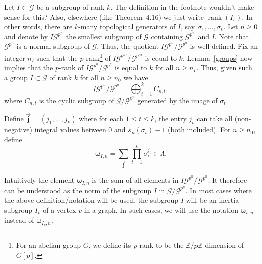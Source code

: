 \documentclass{amsart}
\numberwithin{equation}{section}
\theoremstyle{remark}
\newcommand{\rk}{\operatorname{rank}}
\newcommand{\Z}{\mathbb{Z}}
\newcommand{\cG}{\mathcal{G}}
\newcommand{\bomega}{\boldsymbol{\omega}}
\theoremstyle{plain} %
\begin{document}
{Let $I\subset \mathcal{G}$ be a subgroup of rank $k$. 
The definition in the footnote wouldn't make sense for this?
Also, elsewhere (like Theorem~4.16) we just write $\rk(I_v)$.}
In other words, there are $k$-many topological generators of $I$, say $\sigma_{1},\dots , \sigma_{k}$.
{Let $n\geq 0$ and denote by $I\mathcal{G}^{p^n}$ the smallest subgroup of $\mathcal{G}$ containing $\mathcal{G}^{p^n}$ and $I$. 
Note that $\mathcal{G}^{p^n}$ is a normal subgroup of $\cG$.
Thus, the quotient $I\mathcal{G}^{p^n}/\mathcal{G}^{p^n}$ is well defined.
Fix an integer $n_{{I}}$ such that the $p$-rank\footnote{For an abelian group $G$, we define its $p$-rank to be the $\Z/p\Z$-dimension of $G[p]$.} of $I\mathcal{G}^{p^{n_{I}}}/\mathcal{G}^{p^{n_{I}}}$ is equal to $k$.
Lemma~\ref{groups} now implies that the $p$-rank of $I\mathcal{G}^{p^n}/\mathcal{G}^{p^n}$ is equal to $k$ for all $n\ge n_{{I}}$.}
Thus, given such a group $I\subset \mathcal{G}$ of {rank} $k$ for all $n\ge n_0$ we have 
\[
I\mathcal{G}^{p^n}/\mathcal{G}^{p^n} = \bigoplus_{t=1}^k C_{n,t},
\]
where $C_{n,t}$ is the cyclic subgroup of $\mathcal{G}/\mathcal{G}^{p^n}$ generated by the image of $\sigma_{t}$.

Define $\vec{\mathbf{j}} = (j_1, \ldots, j_k)$ where for each $1 \le t \le k$, the entry $j_t$ can take all (non-negative) integral values between 0 and $s_n(\sigma_{t}) -1$ (both included).
For $n\ge {n_{0}}$, define
\begin{equation}
\label{omega v n defn}
\bomega_{{I},n} = \sum_{\vec{\mathbf{j}}}\prod_{t=1}^k \sigma_{t}^{j_t}\in \Lambda.
\end{equation}

{Intuitively the element $\bomega_{I,n}$ is the sum of all elements in $I\mathcal{G}^{p^n}/\mathcal{G}^{p^n}$.
It therefore can be understood as the norm of the subgroup $I$ in $\mathcal{G}/\mathcal{G}^{p^n}$.
In most cases where the above definition/notation will be used, the subgroup $I$ will be an inertia subgroup $I_v$ of a vertex $v$ in a graph.
In such cases, we will use the notation $\bomega_{v,n}$ instead of $\bomega_{I_v,n}$.}
\end{document}
